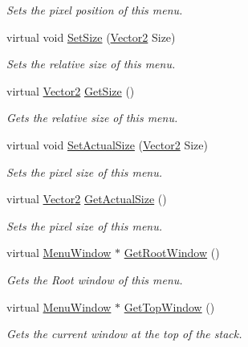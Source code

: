 \begin{DoxyCompactItemize}
\begin{DoxyCompactList}\small\item\em Sets the pixel position of this menu. \item\end{DoxyCompactList}\item 
virtual void \hyperlink{classphys_1_1UI_1_1Menu_a49953d0696195add1c2909cfa5bca0ec}{SetSize} (\hyperlink{classphys_1_1Vector2}{Vector2} Size)
\begin{DoxyCompactList}\small\item\em Sets the relative size of this menu. \item\end{DoxyCompactList}\item 
virtual \hyperlink{classphys_1_1Vector2}{Vector2} \hyperlink{classphys_1_1UI_1_1Menu_a81781199a62bbe7c2e7693ef301223b4}{GetSize} ()
\begin{DoxyCompactList}\small\item\em Gets the relative size of this menu. \item\end{DoxyCompactList}\item 
virtual void \hyperlink{classphys_1_1UI_1_1Menu_aa3fc25ae8a44a7f27becc312492f5fe6}{SetActualSize} (\hyperlink{classphys_1_1Vector2}{Vector2} Size)
\begin{DoxyCompactList}\small\item\em Sets the pixel size of this menu. \item\end{DoxyCompactList}\item 
virtual \hyperlink{classphys_1_1Vector2}{Vector2} \hyperlink{classphys_1_1UI_1_1Menu_af7566b83c50a4a02ac78d174d7c61817}{GetActualSize} ()
\begin{DoxyCompactList}\small\item\em Sets the pixel size of this menu. \item\end{DoxyCompactList}\item 
virtual \hyperlink{classphys_1_1UI_1_1MenuWindow}{MenuWindow} $\ast$ \hyperlink{classphys_1_1UI_1_1Menu_a9926f44b122c804b68034a759ea4a967}{GetRootWindow} ()
\begin{DoxyCompactList}\small\item\em Gets the Root window of this menu. \item\end{DoxyCompactList}\item 
virtual \hyperlink{classphys_1_1UI_1_1MenuWindow}{MenuWindow} $\ast$ \hyperlink{classphys_1_1UI_1_1Menu_acf9a3bc3dd097093cce077cc60c14a6f}{GetTopWindow} ()
\begin{DoxyCompactList}\small\item\em Gets the current window at the top of the stack. \item\end{DoxyCompactList}\end{DoxyCompactItemize}
